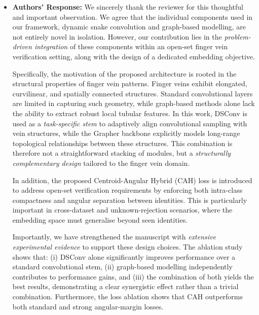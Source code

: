 \documentclass[11pt]{article}
\theoremstyle{remark}
\begin{document}
\begin{itemize}
\item \textbf{Authors' Response:} 
We sincerely thank the reviewer for this thoughtful and important observation. We agree that the individual components used in our framework, dynamic snake convolution and graph-based modelling, are not entirely novel in isolation. However, our contribution lies in the \emph{problem-driven integration} of these components within an open-set finger vein verification setting, along with the design of a dedicated embedding objective.

Specifically, the motivation of the proposed architecture is rooted in the structural properties of finger vein patterns. Finger veins exhibit elongated, curvilinear, and spatially connected structures. Standard convolutional layers are limited in capturing such geometry, while graph-based methods alone lack the ability to extract robust local tubular features. In this work, DSConv is used as a \emph{task-specific stem} to adaptively align convolutional sampling with vein structures, while the Grapher backbone explicitly models long-range topological relationships between these structures. This combination is therefore not a straightforward stacking of modules, but a \emph{structurally complementary design} tailored to the finger vein domain.

In addition, the proposed Centroid-Angular Hybrid (CAH) loss is introduced to address open-set verification requirements by enforcing both intra-class compactness and angular separation between identities. This is particularly important in cross-dataset and unknown-rejection scenarios, where the embedding space must generalise beyond seen identities.

Importantly, we have strengthened the manuscript with \emph{extensive experimental evidence} to support these design choices. The ablation study shows that:
(i) DSConv alone significantly improves performance over a standard convolutional stem,
(ii) graph-based modelling independently contributes to performance gains, and
(iii) the combination of both yields the best results, demonstrating a clear synergistic effect rather than a trivial combination.
Furthermore, the loss ablation shows that CAH outperforms both standard and strong angular-margin losses.


\end{itemize}
\end{document}
